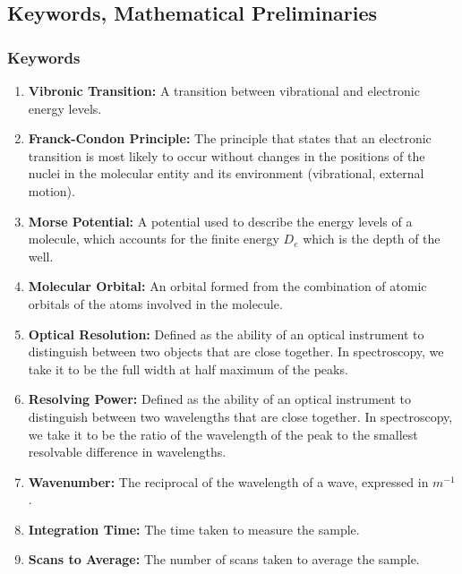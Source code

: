 \documentclass{article}
\begin{document}
\subsection{Keywords, Mathematical Preliminaries}
\subsubsection{Keywords}
\begin{enumerate}
    \item \textbf{Vibronic Transition:} A transition between vibrational and electronic energy levels.
    
    \item \textbf{Franck-Condon Principle:} The principle that states that an electronic transition is most likely to occur without changes in the positions of the nuclei in the molecular entity and its environment (vibrational, external motion)\cite{MolecularSpectroscopy}.
    
    \item \textbf{Morse Potential:} A potential used to describe the energy levels of a molecule, which accounts for the finite energy $D_e$ which is the depth of the well.
    
    \item \textbf{Molecular Orbital:} An orbital formed from the combination of atomic orbitals of the atoms involved in the molecule.
    
    \item \textbf{Optical Resolution:} Defined as the ability of an optical instrument to distinguish between two objects that are close together. In spectroscopy, we take it to be the full width at half maximum of the peaks.
    
    \item \textbf{Resolving Power:} Defined as the ability of an optical instrument to distinguish between two wavelengths that are close together. In spectroscopy, we take it to be the ratio of the wavelength of the peak to the smallest resolvable difference in wavelengths.
    
    \item \textbf{Wavenumber:} The reciprocal of the wavelength of a wave, expressed in $m^{-1}$.
    
    \item \label{kew:int_time}\textbf{Integration Time:} The time taken to measure the sample.
    
    \item \label{kew:s_t_a}\textbf{Scans to Average:} The number of scans taken to average the sample.
    

\end{enumerate}
\end{document}
